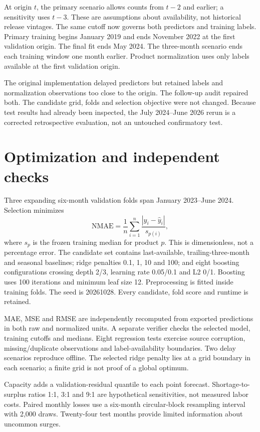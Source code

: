 \documentclass[11pt]{article}
\begin{document}
At origin $t$, the primary scenario allows counts from $t-2$ and earlier; a sensitivity uses $t-3$. These are assumptions about availability, not historical release vintages. The same cutoff now governs both predictors and training labels. Primary training begins January 2019 and ends November 2022 at the first validation origin. The final fit ends May 2024. The three-month scenario ends each training window one month earlier. Product normalization uses only labels available at the first validation origin.

The original implementation delayed predictors but retained labels and normalization observations too close to the origin. The follow-up audit repaired both. The candidate grid, folds and selection objective were not changed. Because test results had already been inspected, the July 2024--June 2026 rerun is a corrected retrospective evaluation, not an untouched confirmatory test.

\section{Optimization and independent checks}
Three expanding six-month validation folds span January 2023--June 2024. Selection minimizes
\[
  \mathrm{NMAE}=\frac1n\sum_{i=1}^n\frac{|y_i-\hat y_i|}{s_{p(i)}},
\]
where $s_p$ is the frozen training median for product $p$. This is dimensionless, not a percentage error. The candidate set contains last-available, trailing-three-month and seasonal baselines; ridge penalties 0.1, 1, 10 and 100; and eight boosting configurations crossing depth 2/3, learning rate 0.05/0.1 and L2 0/1. Boosting uses 100 iterations and minimum leaf size 12. Preprocessing is fitted inside training folds. The seed is 20261028. Every candidate, fold score and runtime is retained.

MAE, MSE and RMSE are independently recomputed from exported predictions in both raw and normalized units. A separate verifier checks the selected model, training cutoffs and medians. Eight regression tests exercise source corruption, missing/duplicate observations and label-availability boundaries. Two delay scenarios reproduce offline. The selected ridge penalty lies at a grid boundary in each scenario; a finite grid is not proof of a global optimum.

Capacity adds a validation-residual quantile to each point forecast. Shortage-to-surplus ratios 1:1, 3:1 and 9:1 are hypothetical sensitivities, not measured labor costs. Paired monthly losses use a six-month circular-block resampling interval with 2,000 draws. Twenty-four test months provide limited information about uncommon surges.
\end{document}
